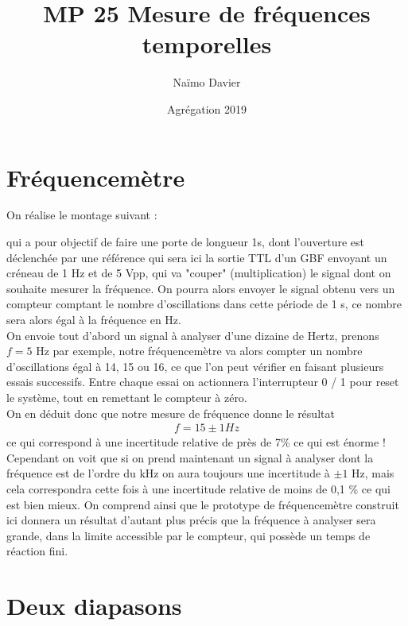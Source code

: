 \documentclass[12pt,prb,aps,epsf]{article}
\begin{document}
	
	\title{MP 25 Mesure de fréquences temporelles}
	\author{Naïmo Davier}
	\date{Agrégation 2019}
	
	\maketitle
	
	\tableofcontents
	
	\pagebreak
	
\section{Fréquencemètre}
On réalise le montage suivant :


qui a pour objectif de faire une porte de longueur 1s, dont l'ouverture est déclenchée par une référence qui sera ici la sortie TTL d'un GBF envoyant un créneau de 1 Hz et de 5 Vpp, qui va "couper" (multiplication) le signal dont on souhaite mesurer la fréquence. On pourra alors envoyer le signal obtenu vers un compteur comptant le nombre d'oscillations dans cette période de 1 s, ce nombre sera alors égal à la fréquence en Hz.\\

On envoie tout d'abord un signal à analyser d'une dizaine de Hertz, prenons $f=5$ Hz par exemple, notre fréquencemètre va alors compter un nombre d'oscillations égal à 14, 15 ou 16, ce que l'on peut vérifier en faisant plusieurs essais successifs. Entre chaque essai on actionnera l'interrupteur 0 / 1 pour reset le système, tout en remettant le compteur à zéro.\\ 
On en déduit donc que notre mesure de fréquence donne le résultat 
\begin{eqnarray}
f = 15 \pm 1 Hz
\end{eqnarray}
ce qui correspond à une incertitude relative de près de 7\% ce qui est énorme !\\
Cependant on voit que si on prend maintenant un signal à analyser dont la fréquence est de l'ordre du kHz on aura toujours une incertitude à $\pm 1$ Hz, mais cela correspondra cette fois à une incertitude relative de moins de 0,1 \% ce qui est bien mieux. On comprend ainsi que le prototype de fréquencemètre construit ici donnera un résultat d'autant plus précis que la fréquence à analyser sera grande, dans la limite accessible par le compteur, qui possède un temps de réaction fini.

\section{Deux diapasons}
\end{document}
